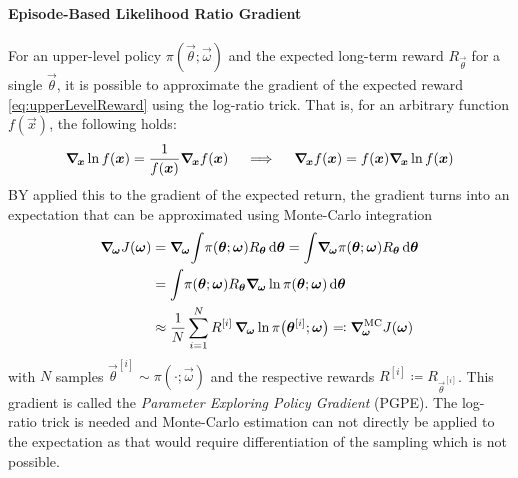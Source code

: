 				\paragraph{Episode-Based Likelihood Ratio Gradient}
					For an upper-level policy \( \pi(\vec{\theta}; \vec{\omega}) \) and the expected long-term reward \( R_{\vec{\theta}} \) for a single \(\vec{\theta}\), it is possible to approximate the gradient of the expected reward \eqref{eq:upperLevelReward} using the log-ratio trick. That is, for an arbitrary function \( f(\vec{x}) \), the following holds:
					\begin{equation*}
						\grad_{\!\bm{x}} \ln f(\bm{x}) = \frac{1}{f(\bm{x})} \grad_{\!\bm{x}} f(\bm{x}) \quad\implies\quad \grad_{\!\bm{x}} f(\bm{x}) = f(\bm{x}) \grad_{\!\bm{x}} \ln f(\bm{x})
					\end{equation*}
					BY applied this to the gradient of the expected return, the gradient turns into an expectation that can be approximated using Monte-Carlo integration
					\begin{align}
						\grad_{\!\vec{\omega}} J(\vec{\omega})
						 & = \grad_{\!\vec{\omega}} \!\int\! \pi(\vec{\theta}; \vec{\omega}) R_{\vec{\theta}} \dd{\vec{\theta}}
						= \int\! \grad_{\!\vec{\omega}} \pi(\vec{\theta}; \vec{\omega}) R_{\vec{\theta}} \dd{\vec{\theta}}  \nonumber                                                                                                                       \\
						 & = \int\! \pi(\vec{\theta}; \vec{\omega}) R_{\vec{\theta}} \grad_{\!\vec{\omega}} \ln \pi(\vec{\theta}; \vec{\omega}) \dd{\vec{\theta}}  \nonumber                                                                                \\
						 & \approx \frac{1}{N} \sum_{i = 1}^{N} R^{[i]} \, \grad_{\!\vec{\omega}} \ln \pi\big(\vec{\theta}^{[i]}; \vec{\omega}\big) \eqqcolon \grad_{\!\vec{\omega}}^\mathrm{MC} J(\vec{\omega})  \label{eq:episodicPolicyGradientGradient}
					\end{align}
					with \(N\) samples \( \vec{\theta}^{[i]} \sim \pi(\cdot; \vec{\omega}) \) and the respective rewards \( R^{[i]} \coloneqq R_{\vec{\theta}^{[i]}} \). This gradient is called the \emph{Parameter Exploring Policy Gradient} (PGPE). The log-ratio trick is needed and Monte-Carlo estimation can not directly be applied to the expectation as that would require differentiation of the sampling which is not possible.

